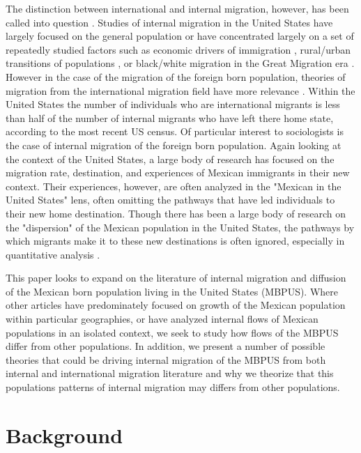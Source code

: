 \documentclass[fleqn,12pt]{olplainarticle}
\begin{document}
The distinction between international and internal migration, however, has been called into question \citep{Ellis2012, King2010}.
Studies of internal migration in the United States have largely focused on the general population \citep{Molloy2011a, Cooke2013} or have concentrated largely on a set of repeatedly studied factors such as economic drivers of immigration \citep{Lichter2009, Light2009, Kritz2010, Calnan2017}, rural/urban transitions of populations \citep{Hernandez-Leon2000, Kandel2005}, or black/white migration in the Great Migration era \citep{Eichenlaub2010}.
However in the case of the migration of the foreign born population, theories of migration from the international migration field have more relevance \citep{King2010}.
Within the United States the number of individuals who are international migrants is less than half of the number of internal migrants who have left there home state, according to the most recent US census.
Of particular interest to sociologists is the case of internal migration of the foreign born population.   
Again looking at the context of the United States, a large body of research has focused on the migration rate, destination, and experiences of Mexican immigrants in their new context.
Their experiences, however, are often analyzed in the "Mexican in the United States" lens, often omitting the pathways that have led individuals to their new home destination.
Though there has been a large body of research on the "dispersion" of the Mexican population in the United States, the pathways by which migrants make it to these new destinations is often ignored, especially in quantitative analysis \citep{Light2009, Massey2010, Crowley2010, Johnson2016}. 

This paper looks to expand on the literature of internal migration and diffusion of the Mexican born population living in the United States (MBPUS).
Where other articles have predominately focused on growth of the Mexican population within particular geographies, or have analyzed internal flows of Mexican populations in an isolated context, we seek to study how flows of the MBPUS differ from other populations.  
In addition, we present a number of possible theories that could be driving internal migration of the MBPUS from both internal and international migration literature and why we theorize that this populations patterns of internal migration may differs from other populations.

\section*{Background}
\end{document}
